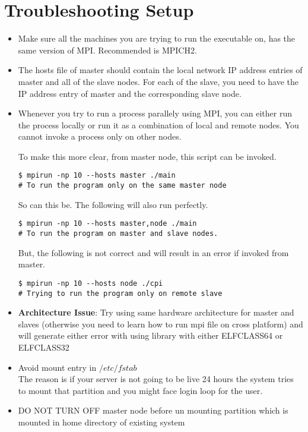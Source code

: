 \documentclass[paper=letter, fontsize=12pt]{article}
\begin{document}
\section{Troubleshooting Setup}
\begin{itemize}
    \item Make sure all the machines you are trying to run the executable on, has the same version of MPI. Recommended is MPICH2.
    \item The hosts file of master should contain the local network IP address entries of master and all of the slave nodes. For each of the slave, you need to have the IP address entry of master and the corresponding slave node.
    \item Whenever you try to run a process parallely using MPI, you can either run the process locally or run it as a combination of local and remote nodes. You cannot invoke a process only on other nodes.
    
    To make this more clear, from master node, this script can be invoked.
    \begin{verbatim}
$ mpirun -np 10 --hosts master ./main
# To run the program only on the same master node
    \end{verbatim}
    So can this be. The following will also run perfectly.
    \begin{verbatim}
$ mpirun -np 10 --hosts master,node ./main
# To run the program on master and slave nodes.
    \end{verbatim}
    But, the following is not correct and will result in an error if invoked from master.
    \begin{verbatim}
$ mpirun -np 10 --hosts node ./cpi
# Trying to run the program only on remote slave
    \end{verbatim}
    \item \textbf{Architecture Issue}: Try using same hardware architecture for master and slaves (otherwise you need to learn how to run mpi file on cross platform) and will generate either error with using library with either ELFCLASS64 or ELFCLASS32
    \item Avoid mount entry in $ /etc/fstab $
    \\ The reason is if your server is not going to be live 24 hours the system tries to mount that partition and you might face login loop for the user.
    \item DO NOT TURN OFF master node before un mounting partition which is mounted in home directory of existing system 
\end{itemize}
\end{document}
